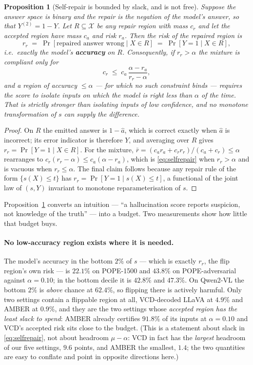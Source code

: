 \documentclass{article}
\theoremstyle{plain}
\newtheorem{proposition}{Proposition}
\theoremstyle{definition}
\theoremstyle{remark}
\begin{document}
\begin{proposition}[Self-repair is bounded by slack, and is not free]
\label{prop:selfrepair}
Suppose the answer space is binary and the repair is the negation of the model's answer, so
that $Y^{(2)}=1-Y$. Let $R\subseteq\mathcal{X}$ be any repair region with mass $c_r$ and let
the accepted region have mass $c_a$ and risk $r_a$. Then the risk of the repaired region is
\[
  r_r \;=\; \Pr[\text{repaired answer wrong}\mid X\in R] \;=\; \Pr[Y=1\mid X\in R],
\]
i.e.\ exactly the model's \textbf{accuracy} on $R$. Consequently, if $r_r>\alpha$ the
mixture is compliant only for
\begin{equation}
\label{eq:selfrepair}
  c_r \;\le\; c_a\,\frac{\alpha-r_a}{r_r-\alpha},
\end{equation}
and a region of accuracy $\le\alpha$ --- for which no such constraint binds --- requires the
score to isolate inputs on which the model is right less than $\alpha$ of the time. That is
strictly stronger than isolating inputs of low \emph{confidence}, and no monotone
transformation of $s$ can supply the difference.
\end{proposition}

\begin{proof}
On $R$ the emitted answer is $1-\hat a$, which is correct exactly when $\hat a$ is
incorrect; its error indicator is therefore $Y$, and averaging over $R$ gives
$r_r=\Pr[Y=1\mid X\in R]$. For the mixture,
$\bar r=(c_ar_a+c_rr_r)/(c_a+c_r)\le\alpha$ rearranges to
$c_r(r_r-\alpha)\le c_a(\alpha-r_a)$, which is \eqref{eq:selfrepair} when $r_r>\alpha$ and
is vacuous when $r_r\le\alpha$. The final claim follows because any repair rule of the form
$\{s(X)\le t\}$ has $r_r=\Pr[Y=1\mid s(X)\le t]$, a functional of the joint law of $(s,Y)$
invariant to monotone reparameterisation of $s$.
\end{proof}

Proposition~\ref{prop:selfrepair} converts an intuition --- ``a hallucination score reports
suspicion, not knowledge of the truth'' --- into a budget. Two measurements show how little
that budget buys.

\paragraph{No low-accuracy region exists where it is needed.}
The model's accuracy in the bottom $2\%$ of $s$ --- which is exactly $r_r$, the flip region's
own risk --- is $22.1\%$ on POPE-1500 and $43.8\%$ on POPE-adversarial against $\alpha=0.10$;
in the bottom decile it is $42.8\%$ and $47.3\%$. On Qwen2-VL the bottom $2\%$ is \emph{above}
chance at $62.4\%$, so flipping there is actively harmful. Only two settings contain a flippable
region at all, VCD-decoded LLaVA at $4.9\%$ and AMBER at $0.9\%$, and they are the two settings
whose \emph{accepted region has the least slack to spend}: AMBER already certifies $91.8\%$ of
its inputs at $\alpha=0.10$ and VCD's accepted risk sits close to the budget. (This is a
statement about slack in \eqref{eq:selfrepair}, not about headroom $\mu-\alpha$: VCD in fact has
the \emph{largest} headroom of our five settings, $9.6$ points, and AMBER the smallest, $1.4$;
the two quantities are easy to conflate and point in opposite directions here.)
\end{document}
